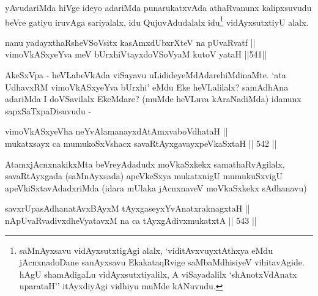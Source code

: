 \begin{artha}
yAvudariMda hiVge ideyo adariMda punarukatxvAda
athaRvanunx kalipxsuvudu beVre gatiyu iruvAga sariyalalx, idu
QujuvAdudalalx idu\footnote{saMnAyxsavu vidAyxsutxtigAgi alalx,
`viditAvxvuyxtAthxya eMdu jAcnxnadoDane sanAyxsavu EkakataqRvige
saMbaMdhisiyeV vihitavAgide. hAgU shamAdigaLu vidAyxsutxtiyalilx, A
viSayadalilx `shAnotxVdAnatx uparataH'' itAyxdiyAgi vidhiyu muMde
kANuvudu.} vidAyxsutxtiyU alalx.
\end{artha}



\begin{shl}
nanu yadayxthaRsheVSoV\s sitx kasAmxdUbxrXteV na pUvaRvatf || \\
vimoVkASxyeYva meV bUrxhiVtayxdoVSoV\s yaM kutoV yataH \hfill ||541||  
\end{shl}

\begin{artha}
AkeSxVpa - heVLabeVkAda viSayavu uLidideyeMdAdare\break hiMdinaMte. `ata UdhavxRM vimoVkASxyeYva bUrxhi'
eMdu Eke heVLalilalx? samAdhAna adariMda I doVSavilalx EkeMdare?
(muMde heVLuva kAraNadiMda) idanunx sapxSaTxpaDisuvudu -
\end{artha}

\begin{shl}
vimoVkASxyeVha neYvAlamanayxdAtAmxvaboVdhataH || \\
mukatxsayx ca mumukoSxVshacx savaRtAyxgavayxpeVkaSxtaH \hfill || 542 ||  
\end{shl}

\begin{artha}
AtamxjAcnxnakikxMta beVreyAdadudx moVkaSxkekx samathaRvAgilalx,\break
savaRtAyxgada (saMnAyxsada) apeVkeSxya mukatxnigU mumukuSxvigU
apeVkiSxtavAdadxriMda (idara mUlaka jAcnxnaveV moVkaSxkekx sAdhanavu)
\end{artha}


\begin{shl}
savxrUpasAdhanatAvxBAyxM tAyxgaseyxYvAnatxraknagxtaH || \\
nApUvaRvadivxdheVyatavxM na ca tAyxgAdivxmukatxtA \hfill || 543 ||  
\end{shl}

